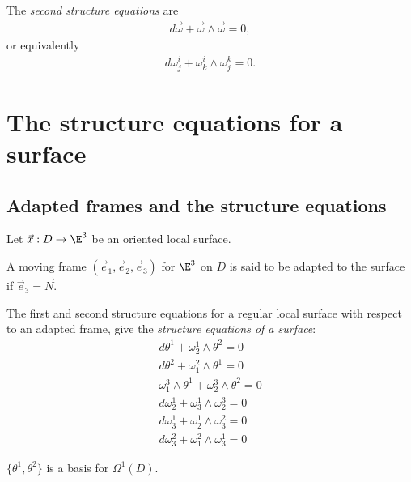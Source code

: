 \documentclass{article}
\begin{document}
\begin{theorem}
	The \emph{second structure equations} are
	\begin{align*}
		d\vec\omega + \vec \omega \wedge\vec \omega = 0,
	\end{align*}
	or equivalently
	\begin{align*}
		d\omega_j^i + \omega_k^i\wedge\omega_j^k=0.
	\end{align*}
\end{theorem}

\section{The structure equations for a surface}

\subsection{Adapted frames and the structure equations}

Let $\vec x: D \to \E^3$ be an oriented local surface.

\begin{definition}
	A moving frame $(\vec e_1, \vec e_2, \vec e_3)$ for $\E^3$ on $D$
	is said to be adapted to the surface if $\vec e_3 = \vec N$.
\end{definition}

\begin{proposition}[Notes 11.2]
	The first and second structure equations for a regular local surface
	with respect to an adapted frame, give the \emph{structure equations
		of a surface}:
	\begin{align*}
		d\theta^1 + \omega_2^1\wedge\theta^2 = 0                \\
		d\theta^2 + \omega_1^2\wedge\theta^1 = 0                \\
		\omega_1^3\wedge\theta^1 + \omega_2^3\wedge\theta^2 = 0 \\
		d\omega_2^1+\omega_3^1\wedge\omega_2^3 = 0              \\
		d\omega_3^1 + \omega_2^1 \wedge \omega_3^2 = 0          \\
		d\omega_3^2 + \omega_1^2 \wedge \omega_3^1 = 0
	\end{align*}
\end{proposition}

\begin{lemma}[Notes 11.3]
	$\{\theta^1, \theta^2\}$ is a basis for $\Omega^1(D)$.
\end{lemma}
\end{document}

